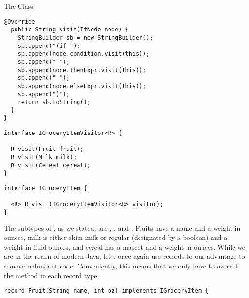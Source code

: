 \begin{verbnobox}[\footnotesize]
\begin{cl}[]{The  Class}
\begin{lstlisting}[language=MyJava]
  @Override
  public String visit(IfNode node) {
    StringBuilder sb = new StringBuilder();
    sb.append("(if ");
    sb.append(node.condition.visit(this));
    sb.append(" ");
    sb.append(node.thenExpr.visit(this));
    sb.append(" ");
    sb.append(node.elseExpr.visit(this));
    sb.append(")");
    return sb.toString();
  }
}
\end{lstlisting}
\end{cl}


\begin{cl}[]{}
\begin{lstlisting}[language=MyJava]
interface IGroceryItemVisitor<R> {

  R visit(Fruit fruit);
  R visit(Milk milk);
  R visit(Cereal cereal);
}
\end{lstlisting}
\end{cl}

\begin{cl}[]{}
\begin{lstlisting}[language=MyJava]
interface IGroceryItem {

  <R> R visit(IGroceryItemVisitor<R> visitor);
}
\end{lstlisting}
\end{cl}

The subtypes of , as we stated, are , , and . Fruits have a name and a weight in ounces, milk is either skim milk or regular (designated by a boolean) and a weight in fluid ounces, and cereal has a mascot and a weight in ounces. While we are in the realm of modern Java, let's once again use records to our advantage to remove redundant code. Conveniently, this means that we only have to override the  method in each record type.

\begin{cl}[]{}
\begin{lstlisting}[language=MyJava]
record Fruit(String name, int oz) implements IGroceryItem {


\end{lstlisting}
\end{cl}
\end{verbnobox}
